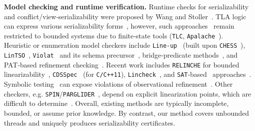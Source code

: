 \medskip
\noindent
\textbf{Model checking and runtime verification.}
%
Runtime checks for serializability and conflict/view‐serializability were proposed by Wang and Stoller~\cite{WaSt06a,WaSt06b}.  
TLA logic~\cite{La94} can express various serializability forms~\cite{CoOlPnTuZu07}, however, such approaches~\cite{SoVaVi20,Ho24} remain restricted to bounded systems due to finite‐state tools (\texttt{TLC}, \texttt{Apalache}~\cite{YuMaLa99,KoKuTr19}).  
Heuristic or enumeration model checkers include \texttt{Line-up}~\cite{BuDeMuTa10} (built upon \texttt{CHESS}~\cite{MuQaBaBaNaNe08}), \texttt{LinTSO}~\cite{BuGoMuYa12}, \texttt{Violat}~\cite{EmEn19} and its schema precursor~\cite{EmEn18}, bridge‐predicate methods~\cite{BuNeSe11,BuSe09}, and PAT‐based refinement checking~\cite{LiChLiSuZhDo12,SuLuDoPa09,LiChLiSu09,Zh11}.  
Recent work includes \texttt{RELINCHE} for bounded linearizability~\cite{GoKoVa25}, \texttt{CDSSpec}~\cite{OuDe17} (for \texttt{C/C++11}), \texttt{Lincheck}~\cite{KoDeSoTsAl23}, and \texttt{SAT}‐based~\cite{BiHeCa09,ViWeMa15} approaches~\cite{BuAlMa07}.  
Symbolic testing~\cite{EmEnHa15} can expose violations of observational refinement~\cite{FiOhRiYa10,BoEmCoHa15}.  
Other checkers, e.g. \texttt{SPIN}/\texttt{PARGLIDER}~\cite{Fl04,VeYaYo09,Ho97,VeYa08}, depend on explicit linearization points, which are difficult to determine~\cite{VeYaYo09}.  
Overall, existing methods are typically incomplete, bounded, or assume prior knowledge.  
By contrast, our method covers unbounded threads and uniquely produces serializability certificates.




